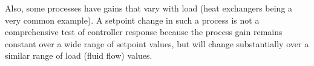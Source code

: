 Also, some processes have gains that vary with load (heat exchangers being a very common example).  A setpoint change in such a process is not a comprehensive test of controller response because the process gain remains constant over a wide range of setpoint values, but will change substantially over a similar range of load (fluid flow) values.




